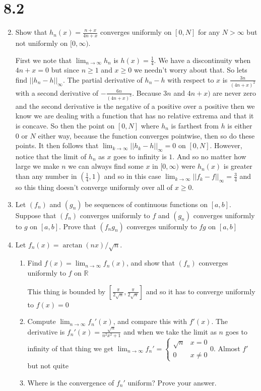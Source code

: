 \documentclass[letterpaper]{article}
\begin{document}
\renewcommand{\labelenumi}{\Alph{enumi}.}
\renewcommand{\labelenumii}{(\alph{enumii})}
\section*{8.2}
\begin{enumerate}
\setcounter{enumi}{1}
\item
Show that $h_n(x)=\frac{n+x}{4n+x}$ converges uniformly on $[0,N]$ for any $N>\infty$ but not uniformly on $[0,\infty)$.

First we note that $\displaystyle \lim_{n\to\infty}h_n$ is $h(x)=\frac{1}{4}$. 
We have a discontinuity when $4n+x=0$ but since $n\ge 1$ and $x\ge 0$ we needn't worry about that. So lets find $||h_n-h||_\infty$. The partial derivative of $h_n-h$ with respect to $x$ is $\displaystyle \frac{3n}{(4n+x)^2}$ with a second derivative of $\displaystyle -\frac{6n}{(4n+x)^3}$. Because $3n$ and $4n+x)$ are never zero and the second derivative is the negative of a positive over a positive then we know we are dealing with a function that has no relative extrema and that it is concave. So then the point on $[0,N]$ where $h_n$ is farthest from $h$ is either $0$ or $N$ either way, because the function converges pointwise, then so do these points. It then follows that $\displaystyle \lim_{k\to\infty}||h_k-h||_\infty=0$ on $[0,N]$. However, notice that the limit of $h_n$ as $x$ goes to infinity is $1$. And so no matter how large we make $n$ we can always find some $x$ in $[0,\infty)$ were $h_n(x)$ is greater than any number in $(\frac{1}{4},1)$ and so in this case $\lim_{k\to\infty}||f_k-f||_\infty=\frac{3}{4}$ and so this thing doesn't converge uniformly over all of $x\ge 0$.
\setcounter{enumi}{3}
\item
Let $(f_n)$ and $(g_n)$ be sequences of continuous functions on $[a,b]$. Suppose that $(f_n)$ converges uniformly to $f$ and $(g_n)$ converges uniformly to $g$ on $[a,b]$. Prove that $(f_ng_n)$ converges uniformly to $fg$ on $[a,b]$
\setcounter{enumi}{5}
\item
Let $f_n(x)=\arctan(nx)/\sqrt{n}$.
  \begin{enumerate}
  \item
  Find $\displaystyle f(x)=\lim_{n\to\infty}f_n(x)$, and show that $(f_n)$ converges uniformly to $f$ on $\mathbb{R}$

  This thing is bounded by $\left[\frac{\pi}{2\sqrt{n}},\frac{\pi}{2\sqrt{n}}\right]$ and so it has to converge uniformly to $f(x)=0$
  \item
  Compute $\displaystyle \lim_{n\to\infty}f_n'(x)$, and compare this with $f'(x)$.
  The derivative is $f_n'(x)=\frac{\sqrt{n}}{n^2x^2+1}$ and when we take the limit as $n$ goes to infinity of that thing we get $\displaystyle \lim_{n\to\infty}f_n'=\begin{cases}\sqrt{n}&x=0\\0&x\ne 0\end{cases}0$. Almost $f'$ but not quite
  \item
  Where is the convergence of $f_n'$ uniform? Prove your answer.


\end{enumerate}
\end{enumerate}
\end{document}
